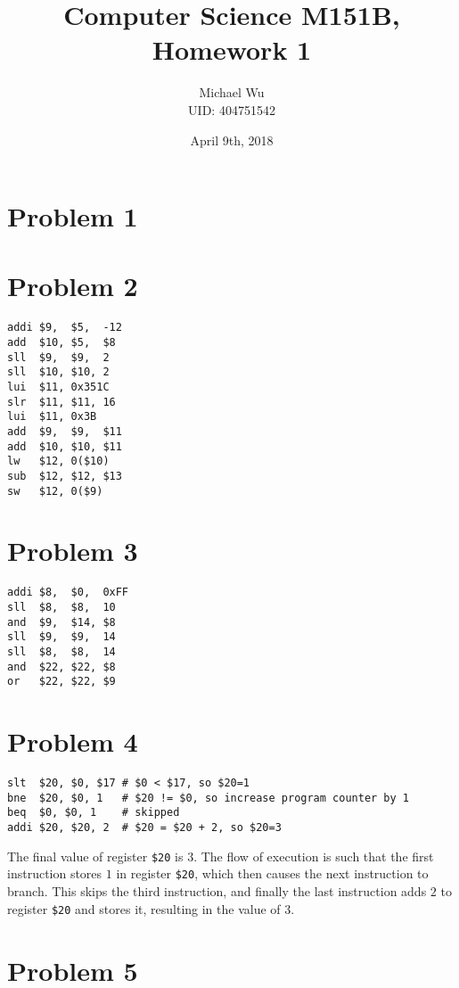 \documentclass[12pt]{article}
\begin{document}
\title{Computer Science M151B, Homework 1}
\date{April 9th, 2018}
\author{Michael Wu\\UID: 404751542}
\maketitle

\section*{Problem 1}
\section*{Problem 2}

\begin{verbatim}
addi $9,  $5,  -12
add  $10, $5,  $8
sll  $9,  $9,  2
sll  $10, $10, 2
lui  $11, 0x351C
slr  $11, $11, 16
lui  $11, 0x3B
add  $9,  $9,  $11
add  $10, $10, $11
lw   $12, 0($10)
sub  $12, $12, $13
sw   $12, 0($9)
\end{verbatim}

\section*{Problem 3}

\begin{verbatim}
addi $8,  $0,  0xFF
sll  $8,  $8,  10
and  $9,  $14, $8
sll  $9,  $9,  14
sll  $8,  $8,  14
and  $22, $22, $8
or   $22, $22, $9
\end{verbatim}

\section*{Problem 4}

\begin{verbatim}
slt  $20, $0, $17 # $0 < $17, so $20=1
bne  $20, $0, 1   # $20 != $0, so increase program counter by 1
beq  $0, $0, 1    # skipped
addi $20, $20, 2  # $20 = $20 + 2, so $20=3
\end{verbatim}

The final value of register \texttt{\$20} is \(3\). The flow of execution is such that the first instruction stores \(1\) in register
\texttt{\$20}, which then causes the next instruction to branch. This skips the third instruction, and finally the last instruction adds
\(2\) to register \texttt{\$20} and stores it, resulting in the value of \(3\).

\section*{Problem 5}
\end{document}

